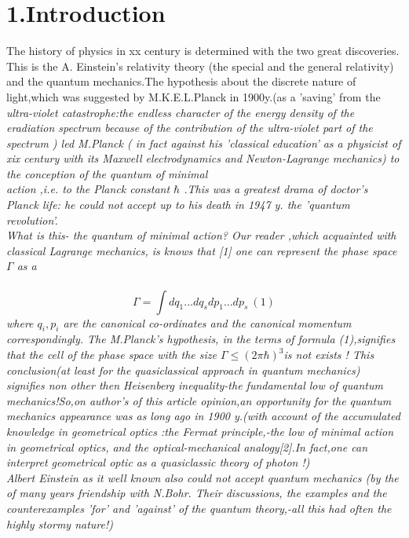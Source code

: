 \documentclass[a4paper,12pt] {article}
\begin{document}
\section* {1.Introduction}
The history of   physics in xx century is determined with the two great discoveries. This is the  A. Einstein's relativity theory
(the special and the general relativity) and the quantum mechanics.The hypothesis about the  discrete nature of light,which
was suggested by M.K.E.L.Planck in 1900y.(as a 'saving' from the \it  ultra-violet catastrophe\rm:the
 endless character of  the energy density of the eradiation spectrum
because of the contribution of the ultra-violet part of
the spectrum ) led M.Planck ( in fact against his 'classical education' as a physicist of xix century with its Maxwell electrodynamics and Newton-Lagrange mechanics) to the conception of  the \it quantum of minimal\\ action
\rm,i.e. to the Planck constant $\hbar$  .This was a greatest drama of doctor's Planck life: he could not accept up to his death in 1947 y. the 'quantum revolution'.\\What is this- the quantum of minimal action? Our reader ,which acquainted with classical Lagrange  mechanics, is knows
that [1] one can represent  the phase space  $ \Gamma$
  as a \\\
\begin{displaymath}
 \Gamma =\int dq_ 1...dq_ sdp_1...dp_s\ (1)
\end{displaymath}
 where $q_i,p_i$  are the canonical co-ordinates and the canonical momentum correspondingly.
The M.Planck's hypothesis, in the terms of formula (1),signifies that \it the cell of the phase space with the size $\Gamma\leq{(2\pi\hbar)}^3$\it  is not exists \rm! This conclusion(at least for the quasiclassical  approach in quantum mechanics)
 signifies non other then  \it Heisenberg inequality\rm -the fundamental low of quantum mechanics!So,on  author's of this article
opinion,an opportunity for  the quantum mechanics appearance was as long ago in 1900 y.(with account of the accumulated knowledge in geometrical optics
:the Fermat principle,-the low of minimal action in geometrical optics, and the optical-mechanical analogy[2].In fact,one can interpret  geometrical optic \it as a quasiclassic theory of photon \rm!)
\\ Albert Einstein as it well known also could not accept  quantum mechanics (by  the of many years friendship with N.Bohr.
 Their discussions, the examples and  the counterexamples 'for' and 'against' of
the quantum theory,-all this had often the highly  stormy nature!)
\end{document}
